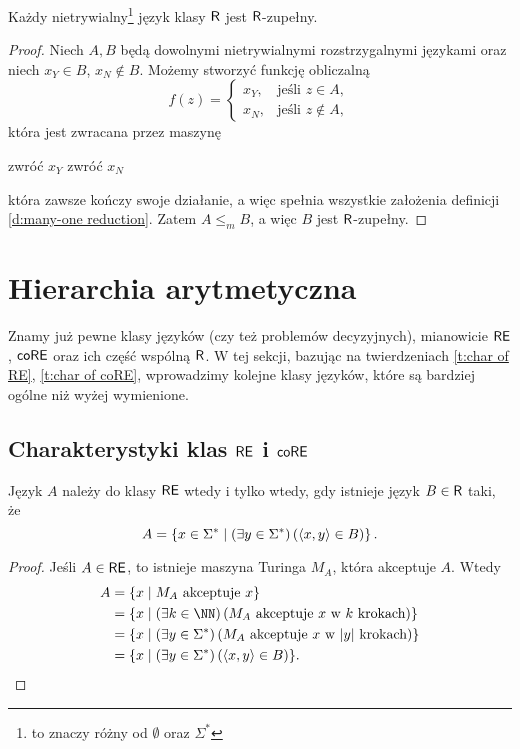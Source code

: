 \begin{theorem}\label{t:nontrivial R language is R-complete}
    Każdy nietrywialny\footnote{to znaczy różny od $\emptyset$ oraz $\Sigma^*$} język klasy $\textsf{R}$ jest $\textsf{R}$-zupełny.
\end{theorem}
\begin{proof}
    Niech $A, B$ będą dowolnymi nietrywialnymi rozstrzygalnymi językami oraz niech $x_Y \in B$, $x_N \notin B$. Możemy stworzyć funkcję obliczalną
    \[ f(z) =
        \begin{cases}
            x_Y, & \text{jeśli } z \in A, \\
            x_N, & \text{jeśli } z \notin A,
        \end{cases}
    \]
    która jest zwracana przez maszynę
    \begin{algorithmic}
            \State zwróć $x_Y$
        \Else
            \State zwróć $x_N$
        \EndIf
    \end{algorithmic}
    która zawsze kończy swoje działanie, a więc spełnia wszystkie założenia definicji \ref{d:many-one reduction}. Zatem $A \leq_m B$, a więc $B$ jest $\textsf{R}$-zupełny.
\end{proof}

\section{Hierarchia arytmetyczna}
Znamy już pewne klasy języków (czy też problemów decyzyjnych), mianowicie $\textsf{RE}$, $\textsf{coRE}$ oraz ich część wspólną $\textsf{R}$. W tej sekcji, bazując na twierdzeniach \ref{t:char of RE}, \ref{t:char of coRE}, wprowadzimy kolejne klasy języków, które są bardziej ogólne niż wyżej wymienione.

\subsection{Charakterystyki klas $\textsf{RE}$ i $\textsf{coRE}$}

\begin{theorem}\label{t:char of RE}
    Język $A$ należy do klasy $\textsf{RE}$ wtedy i tylko wtedy, gdy istnieje język $B \in \textsf{R}$ taki, że
    \[ A = \left\{x \in \Sigma^* \mid \left(\exists y \in \Sigma^* \right) \left(\left\langle x, y \right\rangle \in B\right) \right\}. \]
\end{theorem}
\begin{proof}
    Jeśli $A \in \textsf{RE}$, to istnieje maszyna Turinga $M_A$, która akceptuje $A$. Wtedy
    \begin{align*}
        A &= \{x \mid M_A \text{ akceptuje } x\} \\
        &= \{x \mid \left(\exists k \in \NN\right) \left(M_A \text{ akceptuje } x \text{ w } k \text{ krokach}\right)\} \\
        &= \{x \mid \left(\exists y \in \Sigma^*\right) \left(M_A \text{ akceptuje } x \text{ w } |y| \text{ krokach}\right)\} \\
        &= \{x \mid \left(\exists y \in \Sigma^*\right) \left(\encode{x, y} \in B\right)\}.
    \end{align*}
\end{proof}

